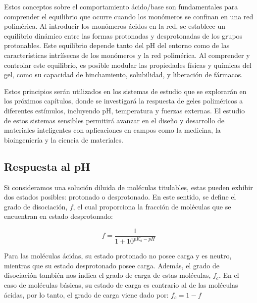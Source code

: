 Estos conceptos sobre el comportamiento \'acido/base son fundamentales para comprender el equilibrio que ocurre cuando los mon\'omeros se confinan en una red polim\'erica. Al introducir los mon\'omeros \'acidos en la red, se establece un equilibrio din\'amico entre las formas protonadas y desprotonadas de los grupos protonables. Este equilibrio depende tanto del pH del entorno como de las caracter\'isticas intrí\'isecas de los mon\'omeros y la red polim\'erica. Al comprender y controlar este equilibrio, es posible modular las propiedades f\'isicas y qu\'imicas del gel, como su capacidad de hinchamiento, solubilidad, y liberaci\'on de f\'armacos.

Estos principios ser\'an utilizados en los sistemas de estudio que se explorar\'an en los pr\'oximos cap\'itulos, donde se investigar\'a la respuesta de geles polim\'ericos a diferentes est\'imulos, incluyendo pH, temperatura y fuerzas externas. El estudio de estos sistemas sensibles permitir\'a avanzar en el dise\~no y desarrollo de materiales inteligentes con aplicaciones en campos como la medicina, la bioingenier\'ia y la ciencia de materiales.


\subsection{Respuesta al pH} \label{sec:film:respuesta-pH}

Si consideramos una soluci\'on diluida de mol\'eculas titulables, estas pueden exhibir dos estados posibles: protonado o desprotonado. En este sentido, se define el grado de disociaci\'on, $f$, el cual proporciona la fracci\'on de mol\'eculas que se encuentran en estado desprotonado:

\begin{equation}
	f = \frac{1}{1+10^{pK_a -pH}}
	\label{eq:film:diso-ideal}
\end{equation}

Para las mol\'eculas \'acidas, su estado protonado no posee carga y es neutro, mientras que su estado desprotonado posee carga. Adem\'as, el grado de disociaci\'on tambi\'en nos indica el grado de carga de estas mol\'eculas, $f_c$. 
En el caso de mol\'eculas b\'asicas, su estado de carga es contrario al de las mol\'eculas \'acidas, por lo tanto, el grado de carga viene dado por: $f_c = 1 -f$


